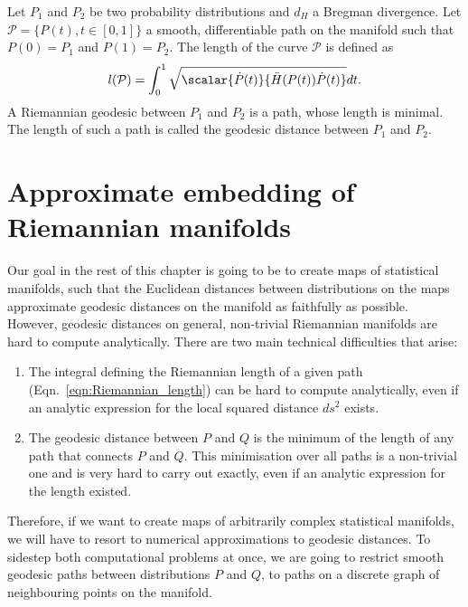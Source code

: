 \begin{definition}
	Let $P_1$ and $P_2$ be two probability distributions and $d_H$ a Bregman divergence. Let $\mathcal{P}=\{P(t),t\in[0,1]\}$ a smooth, differentiable path on the manifold such that $P(0)=P_1$ and $P(1)=P_2$. The length of the curve $\mathcal{P}$ is defined as
	\begin{equation}
		l(\mathcal{P}) = \int_{0}^{1} \sqrt{ \scalar{\dot{P}(t)}{\ddot{H}(P(t))\dot{P}(t)}} dt. \label{eqn:Riemannian_length}
	\end{equation}
	A Riemannian geodesic between $P_1$ and $P_2$ is a path, whose length is minimal. The length of such a path is called the geodesic distance between $P_1$ and $P_2$.
\end{definition}


\section{Approximate embedding of Riemannian manifolds}

Our goal in the rest of this chapter is going to be to create maps of statistical manifolds, such that the Euclidean distances between distributions on the maps approximate geodesic distances on the manifold as faithfully as possible. However, geodesic distances on general, non-trivial Riemannian manifolds are hard to compute analytically. There are two main technical difficulties that arise:

\begin{enumerate}
	\item The integral defining the Riemannian length of a given path (Eqn.\ \eqref{eqn:Riemannian_length}) can be hard to compute analytically, even if an analytic expression for the local squared distance $ds^2$ exists.
	\item The geodesic distance between $P$ and $Q$ is the minimum of the length of any path that connects $P$ and $Q$. This minimisation over all paths is a non-trivial one and is very hard to carry out exactly, even if an analytic expression for the length existed.
\end{enumerate}

Therefore, if we want to create maps of arbitrarily complex statistical manifolds, we will have to resort to numerical approximations to geodesic distances. To sidestep both computational problems at once, we are going to restrict smooth geodesic paths between distributions $P$ and $Q$, to paths on a discrete graph of neighbouring points on the manifold.

